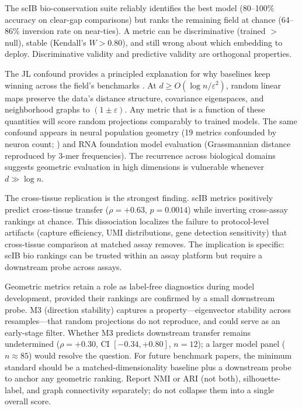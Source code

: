 \documentclass[11pt]{article}
\begin{document}
The scIB bio-conservation suite reliably identifies the best model (80--100\% accuracy on clear-gap comparisons) but ranks the remaining field at chance (64--86\% inversion rate on near-ties). A metric can be discriminative (trained $>$ null), stable (Kendall's $W > 0.80$), and still wrong about which embedding to deploy. Discriminative validity and predictive validity are orthogonal properties.

The JL confound provides a principled explanation for why baselines keep winning across the field's benchmarks \citep{johnsonlindenstrauss1984}. At $d \geq O(\log n / \varepsilon^2)$, random linear maps preserve the data's distance structure, covariance eigenspaces, and neighborhood graphs to $(1 \pm \varepsilon)$. Any metric that is a function of these quantities will score random projections comparably to trained models. The same confound appears in neural population geometry (19 metrics confounded by neuron count; \citealp{tower2026bracket}) and RNA foundation model evaluation (Grassmannian distance reproduced by 3-mer frequencies). The recurrence across biological domains suggests geometric evaluation in high dimensions is vulnerable whenever $d \gg \log n$.

The cross-tissue replication is the strongest finding. scIB metrics positively predict cross-tissue transfer ($\rho = +0.63$, $p = 0.0014$) while inverting cross-assay rankings at chance. This dissociation localizes the failure to protocol-level artifacts (capture efficiency, UMI distributions, gene detection sensitivity) that cross-tissue comparison at matched assay removes. The implication is specific: scIB bio rankings can be trusted within an assay platform but require a downstream probe across assays.

Geometric metrics retain a role as label-free diagnostics during model development, provided their rankings are confirmed by a small downstream probe. M3 (direction stability) captures a property---eigenvector stability across resamples---that random projections do not reproduce, and could serve as an early-stage filter. Whether M3 predicts downstream transfer remains undetermined ($\rho = +0.30$, CI $[-0.34, +0.80]$, $n = 12$); a larger model panel ($n \approx 85$) would resolve the question. For future benchmark papers, the minimum standard should be a matched-dimensionality baseline plus a downstream probe to anchor any geometric ranking. Report NMI or ARI (not both), silhouette-label, and graph connectivity separately; do not collapse them into a single overall score.
\end{document}
